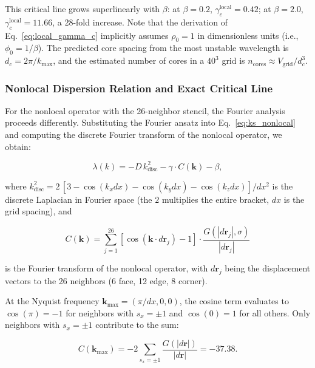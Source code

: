 \documentclass[sn-nature,pdflatex]{sn-jnl}
\begin{document}
This critical line grows superlinearly with $\beta$: at $\beta = 0.2$, $\gamma_c^{\text{local}} = 0.42$; at $\beta = 2.0$, $\gamma_c^{\text{local}} = 11.66$, a 28-fold increase. Note that the derivation of Eq.~\eqref{eq:local_gamma_c} implicitly assumes $\rho_0 = 1$ in dimensionless units (i.e., $\phi_0 = 1/\beta$).
The predicted core spacing from the most unstable wavelength is $d_c = 2\pi/k_{\max}$, and the estimated number of cores in a $40^3$ grid is $n_{\text{cores}} \approx V_{\text{grid}} / d_c^3$.

\subsubsection{Nonlocal Dispersion Relation and Exact Critical Line}

For the nonlocal operator with the 26-neighbor stencil, the Fourier analysis proceeds differently.
Substituting the Fourier ansatz into Eq.~\eqref{eq:ks_nonlocal} and computing the discrete Fourier transform of the nonlocal operator, we obtain:

\begin{equation}
\label{eq:nonlocal_dispersion}
\lambda(k) = -D\,k^2_{\text{disc}} - \gamma \cdot C(\mathbf{k}) - \beta,
\end{equation}

where $k^2_{\text{disc}} = 2\,[3 - \cos(k_x dx) - \cos(k_y dx) - \cos(k_z dx)]/dx^2$ is the discrete Laplacian in Fourier space (the $2$ multiplies the entire bracket, $dx$ is the grid spacing), and

\begin{equation}
C(\mathbf{k}) = \sum_{j=1}^{26} [\cos(\mathbf{k} \cdot d\mathbf{r}_j) - 1] \cdot \frac{G(|d\mathbf{r}_j|, \sigma)}{|d\mathbf{r}_j|}
\end{equation}

is the Fourier transform of the nonlocal operator, with $d\mathbf{r}_j$ being the displacement vectors to the 26 neighbors (6 face, 12 edge, 8 corner).

At the Nyquist frequency $\mathbf{k}_{\max} = (\pi/dx, 0, 0)$, the cosine term evaluates to $\cos(\pi) = -1$ for neighbors with $s_x = \pm 1$ and $\cos(0) = 1$ for all others.
Only neighbors with $s_x = \pm 1$ contribute to the sum:

\begin{equation}
C(\mathbf{k}_{\max}) = -2 \sum_{s_x = \pm 1} \frac{G(|d\mathbf{r}|)}{|d\mathbf{r}|} = -37.38.
\end{equation}
\end{document}
